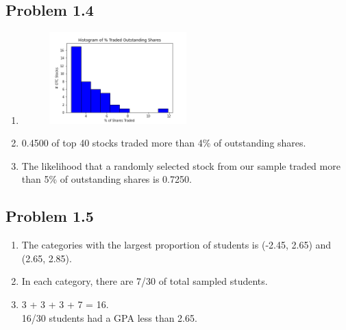 \documentclass[12pt]{article}
\begin{document}
\subsection*{Problem 1.4}
    \begin{enumerate}[label=(\alph*).]
        \item 
        \begin{figure}[H]
        \centering
        \includegraphics[width=0.5\textwidth]{1_4_a.png}
        \end{figure}
        
        \item 0.4500 of top 40 stocks traded more than 4\% of outstanding shares.
        
        \item The likelihood that a randomly selected stock from our sample traded more than 5\% of outstanding shares is 0.7250.
        
        
    \end{enumerate}

\subsection*{Problem 1.5}
    \begin{enumerate}[label=(\alph*).]
        \item The categories with the largest proportion of students is (-2.45, 2.65) and (2.65, 2.85). 
        
        \item In each category, there are 7/30 of total sampled students.
        
        \item 3 + 3 + 3 + 7 = 16. \\
        
        16/30 students had a GPA less than 2.65. \\
        
        
    \end{enumerate}
\end{document}
